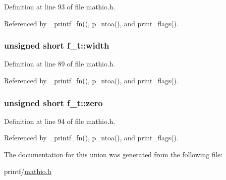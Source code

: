 Definition at line 93 of file mathio.\+h.



Referenced by \+\_\+printf\+\_\+fn(), p\+\_\+ntoa(), and print\+\_\+flags().

\subsubsection[{\texorpdfstring{width}{width}}]{\setlength{\rightskip}{0pt plus 5cm}unsigned short f\+\_\+t\+::width}\hypertarget{unionf__t_ad6b1584314c27653690552e95e1ed96f}{}\label{unionf__t_ad6b1584314c27653690552e95e1ed96f}


Definition at line 89 of file mathio.\+h.



Referenced by \+\_\+printf\+\_\+fn(), p\+\_\+ntoa(), and print\+\_\+flags().

\subsubsection[{\texorpdfstring{zero}{zero}}]{\setlength{\rightskip}{0pt plus 5cm}unsigned short f\+\_\+t\+::zero}\hypertarget{unionf__t_ac70397e87721255908299c190f3e5670}{}\label{unionf__t_ac70397e87721255908299c190f3e5670}


Definition at line 94 of file mathio.\+h.



Referenced by \+\_\+printf\+\_\+fn(), p\+\_\+ntoa(), and print\+\_\+flags().



The documentation for this union was generated from the following file\+:\begin{DoxyCompactItemize}
\item 
printf/\hyperlink{mathio_8h}{mathio.\+h}\end{DoxyCompactItemize}
